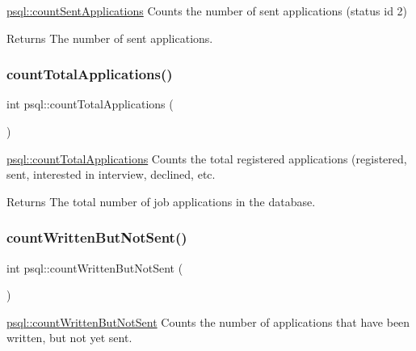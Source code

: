\mbox{\hyperlink{classpsql_a1aa2281c867a8a2916963ec9391c2320}{psql\+::count\+Sent\+Applications}} Counts the number of sent applications (status id 2) 

\begin{DoxyReturn}{Returns}
The number of sent applications. 
\end{DoxyReturn}
\mbox{\label{classpsql_afc6d7fe8bd179fb7341917b430883963}} 
\subsubsection{\texorpdfstring{count\+Total\+Applications()}{countTotalApplications()}}
{\footnotesize\ttfamily int psql\+::count\+Total\+Applications (\begin{DoxyParamCaption}{ }\end{DoxyParamCaption})}



\mbox{\hyperlink{classpsql_afc6d7fe8bd179fb7341917b430883963}{psql\+::count\+Total\+Applications}} Counts the total registered applications (registered, sent, interested in interview, declined, etc. 

\begin{DoxyReturn}{Returns}
The total number of job applications in the database. 
\end{DoxyReturn}
\mbox{\label{classpsql_a0d16f7ff59525da8743b10cb5ca29636}} 
\subsubsection{\texorpdfstring{count\+Written\+But\+Not\+Sent()}{countWrittenButNotSent()}}
{\footnotesize\ttfamily int psql\+::count\+Written\+But\+Not\+Sent (\begin{DoxyParamCaption}{ }\end{DoxyParamCaption})}



\mbox{\hyperlink{classpsql_a0d16f7ff59525da8743b10cb5ca29636}{psql\+::count\+Written\+But\+Not\+Sent}} Counts the number of applications that have been written, but not yet sent. 

